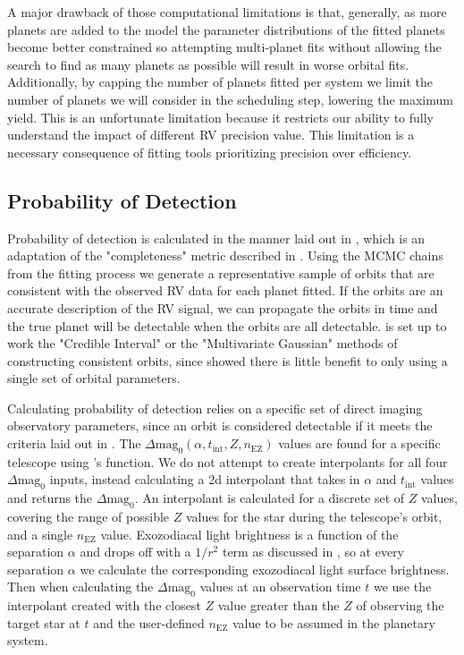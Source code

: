 A major drawback of those computational limitations is that, generally, as more
planets are added to the model the parameter distributions of the fitted
planets become better constrained so attempting multi-planet fits without
allowing the search to find as many planets as possible will result in worse
orbital fits. Additionally, by capping the number of planets fitted per system
we limit the number of planets we will consider in the scheduling step,
lowering the maximum yield. This is an unfortunate limitation because it
restricts our ability to fully understand the impact of different RV precision
value. This limitation is a necessary consequence of fitting tools prioritizing
precision over efficiency.

\subsection{Probability of Detection}

Probability of detection is calculated in the manner laid out in
, which is an adaptation of the "completeness" metric
described in \citep{brownSingleVisitPhotometric2005}. Using the MCMC chains
from the fitting process we generate a representative sample of orbits that are
consistent with the observed RV data for each planet fitted. If the orbits are
an accurate description of the RV signal, we can propagate the orbits in time
and the true planet will be detectable when the orbits are all detectable.
 is set up to work the "Credible Interval" or the
"Multivariate Gaussian" methods of constructing consistent orbits, since
 showed there is little benefit to only using a single
set of orbital parameters.

Calculating probability of detection relies on a specific set of direct imaging
observatory parameters, since an orbit is considered detectable if it meets the
criteria laid out in . The
$\Delta\textrm{mag}_0(\alpha, t_{\textrm{int}}, Z, n_\textrm{EZ})$ values are
found for a specific telescope using 's
 function. We do not attempt to create
interpolants for all four $\Delta\textrm{mag}_0$ inputs, instead calculating a
2d interpolant that takes in $\alpha$ and $t_\textrm{int}$ values and returns
the $\Delta\textrm{mag}_0$. An interpolant is calculated for a discrete set of
$Z$ values, covering the range of possible $Z$ values for the star during the
telescope's orbit, and a single $n_\textrm{EZ}$ value. Exozodiacal light
brightness is a function of the separation $\alpha$ and drops off with a
$1/r^2$ term as discussed in \citet{starkMaximizingExoEarthCandidate2014}, so
at every separation $\alpha$ we calculate the corresponding exozodiacal light
surface brightness. Then when calculating the $\Delta\textrm{mag}_0$ values at
an observation time $t$ we use the interpolant created with the closest $Z$
value greater than the $Z$ of observing the target star at $t$ and the
user-defined $n_\textrm{EZ}$ value to be assumed in the planetary system. 

